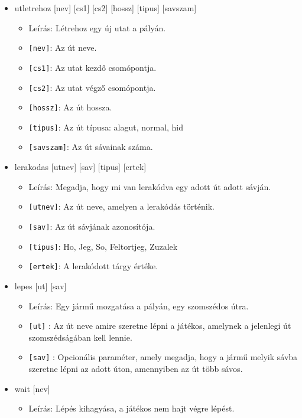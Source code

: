 \begin{itemize}
    \item utletrehoz [nev] [cs1] [cs2] [hossz] [tipus] [savszam]
    \begin{itemize}
        \item Leírás: Létrehoz egy új utat a pályán.
        \item \texttt{[nev]}: Az út neve.
        \item \texttt{[cs1]}: Az utat kezdő csomópontja.
        \item \texttt{[cs2]}: Az utat végző csomópontja.
        \item \texttt{[hossz]}: Az út hossza.
        \item \texttt{[tipus]}: Az út típusa: alagut, normal, hid
        \item \texttt{[savszam]}: Az út sávainak száma.
    \end{itemize}

    \item lerakodas [utnev] [sav] [tipus] [ertek]
    \begin{itemize}
        \item Leírás: Megadja, hogy mi van lerakódva egy adott út adott sávján. 
        \item \texttt{[utnev]}: Az út neve, amelyen a lerakódás történik.
        \item \texttt{[sav]}: Az út sávjának azonosítója.
        \item \texttt{[tipus]}: Ho, Jeg, So, Feltortjeg, Zuzalek
        \item \texttt{[ertek]}: A lerakódott tárgy értéke.
    \end{itemize}

    \item lepes [ut] [sav]
    \begin{itemize}
        \item Leírás: Egy jármű mozgatása a pályán, egy szomszédos útra. 
        \item \texttt{[ut]} : Az út neve amire szeretne lépni a játékos, amelynek a jelenlegi út szomszédságában kell lennie.
        \item \texttt{[sav]} : Opcionális paraméter, amely megadja, hogy a jármű melyik sávba szeretne lépni az adott úton, amennyiben az út több sávos.
    \end{itemize}

    \item wait [nev]
    \begin{itemize}
        \item Leírás: Lépés kihagyása, a játékos nem hajt végre lépést.
    \end{itemize}


\end{itemize}
